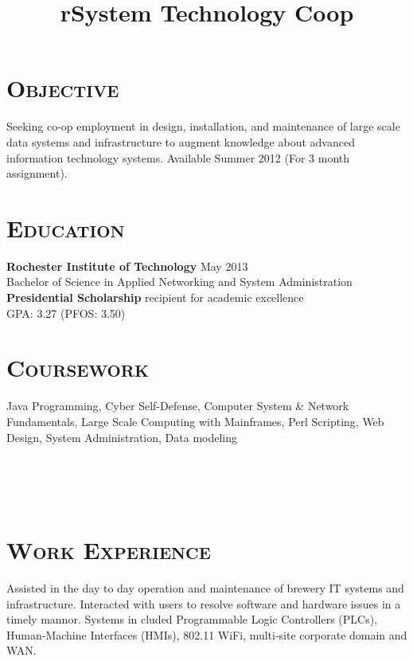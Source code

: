 \begin{resume}


\section{\textsc{Objective}}
Seeking co-op employment in design, installation, and maintenance of large scale data systems and infrastructure to augment knowledge about advanced information technology systems. Available Summer 2012 (For 3 month assignment).
\section{\textsc{Education}}

\textbf{Rochester Institute of Technology} \hfill May 2013 \\
Bachelor of Science in Applied Networking and System Administration \\
{\bf Presidential Scholarship} recipient for academic excellence \\
GPA: 3.27 (PFOS: 3.50)

\section{\textsc{Coursework}}

Java Programming, Cyber Self-Defense, Computer System \& Network Fundamentals, Large Scale Computing with Mainframes, Perl Scripting, Web Design, System Administration, Data modeling

\begin{formatb}
  \title{r}\\
  \\
  \body\\
\end{formatb}

\section{\textsc{Work Experience}}

\title{System Technology Coop}
\begin{position}
Assisted in the day to day operation and maintenance of brewery IT systems and infrastructure. Interacted with users to resolve software and hardware issues in a timely mannor. Systems in cluded Programmable Logic Controllers (PLCs), Human-Machine Interfaces (HMIs), 802.11 WiFi, multi-site corporate domain and WAN.
\end{position}


\end{resume}
